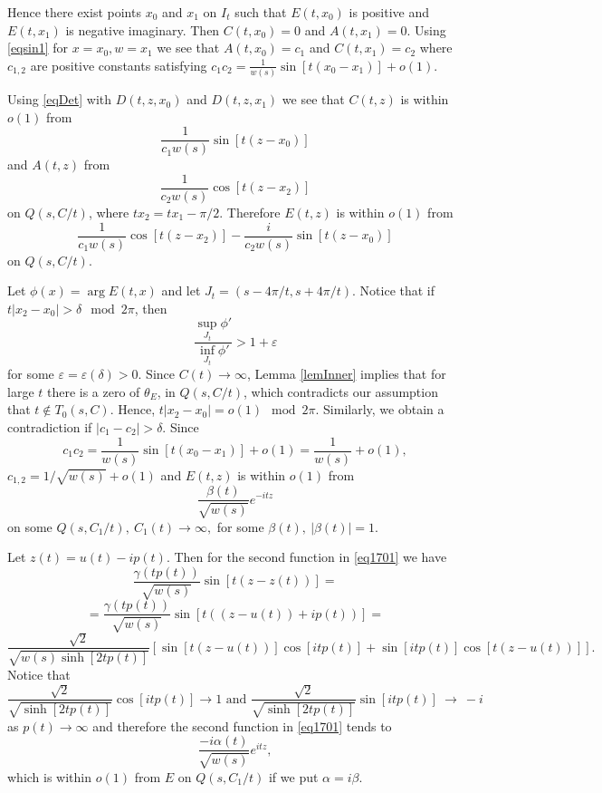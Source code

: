 \documentclass[11pt,twoside,reqno]{amsart}
\def\to{\rightarrow}
\def\C{{\mathbb{C}}}
\def\e{\varepsilon}
\def\d{\delta}
\def\g{\gamma}
\def\a{\alpha}
\def\b{\beta}
\theoremstyle{plain}
\numberwithin{equation}{section}
\begin{document}
Hence there exist points $x_0$ and $x_1$ on $I_t$ such that $E(t,x_0)$ is positive and $E(t,x_1)$ is negative imaginary.
Then  $C(t,x_0)=0$ and $A(t,x_1)=0$. Using \eqref{eqsin1} for $x=x_0, w=x_1$ we see that
$A(t,x_0)= c_1$ and $C(t,x_1)= c_2$ where $c_{1,2}$ are positive constants satisfying $c_1c_2=\frac 1{w(s)}\sin [t(x_0-x_1)]+o(1)$.

Using \eqref{eqDet} with $D(t,z,x_0)$ and $D(t,z,x_1)$ we see that $C(t,z)$ is within $o(1)$ from
$$\frac 1{c_1w(s)}\sin [t(z-x_0)]$$ and $A(t,z)$ from $$\frac 1{c_2w(s)}\cos [t(z-x_2)]$$ on $Q(s,C/t)$, where
$tx_2=tx_1-\pi/2$. Therefore
$E(t,z)$ is within $o(1)$ from $$\frac 1{c_1w(s)}\cos [t(z-x_2)]-\frac i{c_2w(s)}\sin [t(z-x_0)]$$
on $Q(s,C/t)$.

Let $\phi(x)=\arg E(t,x)$ and let $J_t=(s-4\pi/t,s+4\pi/t)$.
Notice that if $t|x_2-x_0|>\d\mod 2\pi$, then
$$\frac{\sup_{J_t} \phi'}{\inf_{J_t }\phi'}>1+\e$$
for some $\e=\e(\d)>0$. Since $C(t)\to\infty$, Lemma \ref{lemInner} implies that for large $t$ there is a zero
of $\theta_E$, in $Q(s,C/t)$, which contradicts our assumption that $t\not\in T_0(s,C)$.
Hence, $t|x_2-x_0|=o(1)\mod 2\pi$.
Similarly, we obtain a contradiction if $|c_1-c_2|>\delta$. Since
$$c_1c_2=\frac 1{w(s)}\sin [t(x_0-x_1)]+o(1)=\frac 1{w(s)}+o(1),$$
$c_{1,2}=1/\sqrt{w(s)}+o(1)$
 and $E(t,z)$ is within $o(1)$ from $$\frac {\b(t)}{\sqrt{w(s)}}e^{-itz}$$
on some $Q(s,C_1/t),\ C_1(t)\to\infty,$ for some $\b(t),\ |\b(t)|=1$.





Let $z(t)=u(t)-ip(t)$. Then for the second function in \eqref{eq1701} we have
$$\frac {\g(tp(t))}{\sqrt{w(s)}}\sin [t(z - z(t))]=$$$$=\frac {\g(tp(t))}{\sqrt{w(s)}}\sin [t((z-u(t))+ip(t))]=
$$$$
\frac {\sqrt{ 2}}{\sqrt{w(s)\sinh [2tp(t)]}}\left[\sin [t(z-u(t))]\cos [itp(t)]+\sin [itp(t)]\cos [t(z-u(t))]\right].
$$
Notice that
$$\frac {\sqrt{ 2}}{\sqrt{\sinh [2tp(t)]}}\cos [itp(t)]\to 1\textrm{ and  }\frac {\sqrt{ 2}}{\sqrt{\sinh [2tp(t)]}}\sin [itp(t)]\ \to\ -i
$$
as $p(t)\to\infty$ and therefore the second function in \eqref{eq1701} tends to $$\frac{-i\a(t)}{\sqrt{w(s)}}e^{itz},$$ which is within $o(1)$ from $E$
on $Q(s,C_1/t)$ if we put $\a=i\b$.
\end{document}
